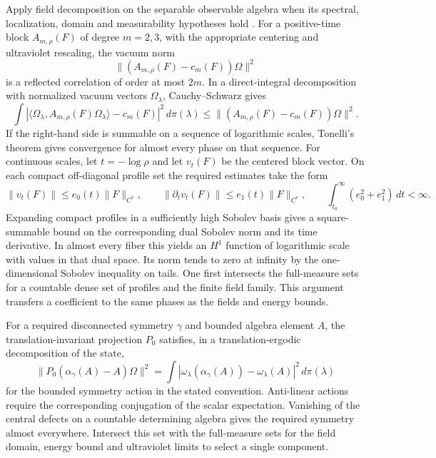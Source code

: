 \documentclass[11pt,letterpaper]{article}
\begin{document}
Apply field decomposition on the separable observable algebra when its
spectral, localization, domain and measurability hypotheses hold
\cite{DS}. For a positive-time block \(A_{m,\rho}(F)\) of degree
\(m=2,3\), with the appropriate centering and ultraviolet rescaling, the
vacuum norm
\[
 \big\|(A_{m,\rho}(F)-c_m(F))\Omega\big\|^2
\]
is a reflected correlation of order at most \(2m\). In a direct-integral decomposition with normalized vacuum
vectors \(\Omega_\lambda\), Cauchy--Schwarz gives
\[
 \int |\langle\Omega_\lambda,A_{m,\rho}(F)\Omega_\lambda\rangle
          -c_m(F)|^2\,d\pi(\lambda)
 \le \big\|(A_{m,\rho}(F)-c_m(F))\Omega\big\|^2 .
\]
If the right-hand side is summable on a sequence of logarithmic scales,
Tonelli's theorem gives convergence for almost every phase on that
sequence. For continuous scales, let \(t=-\log\rho\) and let
\(v_t(F)\) be the centered block vector. On each compact off-diagonal
profile set the required estimates take the form
\[
 \|v_t(F)\|\le e_0(t)\|F\|_{C^r},\qquad
 \|\partial_t v_t(F)\|\le e_1(t)\|F\|_{C^r},\qquad
 \int_{t_0}^{\infty}(e_0^2+e_1^2)\,dt<\infty .
\]
Expanding compact profiles in a sufficiently high Sobolev basis gives
a square-summable bound on the corresponding dual Sobolev norm and its
time derivative. In almost every fiber this yields an \(H^1\) function
of logarithmic scale with values in that dual space. Its norm tends to
zero at infinity by the one-dimensional Sobolev inequality on tails.
One first intersects the full-measure sets for a countable dense set
of profiles and the finite field family. This argument transfers a
coefficient to the same phases as the fields and energy bounds.

For a required disconnected symmetry \(\gamma\) and bounded algebra
element \(A\), the translation-invariant projection \(P_0\) satisfies,
in a translation-ergodic decomposition of the state,
\[
 \|P_0(\alpha_\gamma(A)-A)\Omega\|^2
  =\int|\omega_\lambda(\alpha_\gamma(A))-\omega_\lambda(A)|^2\,
                   d\pi(\lambda)
\]
for the bounded symmetry action in the stated convention. Anti-linear
actions require the corresponding conjugation of the scalar expectation.
Vanishing of the central defects on a countable determining algebra
gives the required symmetry almost everywhere. Intersect this set with
the full-measure sets for the field domain, energy bound and ultraviolet
limits to select a single component.

\end{document}
